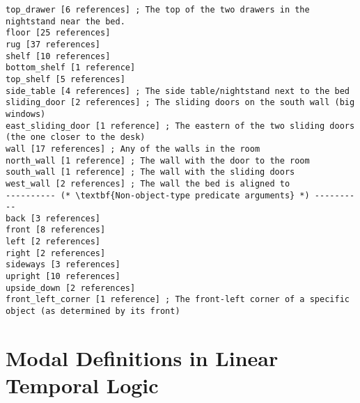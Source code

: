 \documentclass{article}
\begin{document}
\begin{lstlisting}
top_drawer [6 references] ; The top of the two drawers in the nightstand near the bed.
floor [25 references] 
rug [37 references] 
shelf [10 references] 
bottom_shelf [1 reference] 
top_shelf [5 references] 
side_table [4 references] ; The side table/nightstand next to the bed
sliding_door [2 references] ; The sliding doors on the south wall (big windows)
east_sliding_door [1 reference] ; The eastern of the two sliding doors (the one closer to the desk)
wall [17 references] ; Any of the walls in the room
north_wall [1 reference] ; The wall with the door to the room
south_wall [1 reference] ; The wall with the sliding doors
west_wall [2 references] ; The wall the bed is aligned to
---------- (* \textbf{Non-object-type predicate arguments} *) ----------
back [3 references] 
front [8 references] 
left [2 references] 
right [2 references] 
sideways [3 references] 
upright [10 references] 
upside_down [2 references] 
front_left_corner [1 reference] ; The front-left corner of a specific object (as determined by its front)
\end{lstlisting}




\section{Modal Definitions in Linear Temporal Logic}
\end{document}
